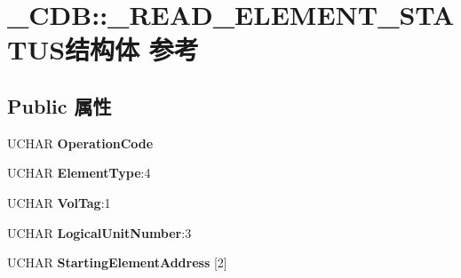 \hypertarget{struct___c_d_b_1_1___r_e_a_d___e_l_e_m_e_n_t___s_t_a_t_u_s}{}\section{\+\_\+\+C\+DB\+:\+:\+\_\+\+R\+E\+A\+D\+\_\+\+E\+L\+E\+M\+E\+N\+T\+\_\+\+S\+T\+A\+T\+U\+S结构体 参考}
\label{struct___c_d_b_1_1___r_e_a_d___e_l_e_m_e_n_t___s_t_a_t_u_s}
\subsection*{Public 属性}
\begin{DoxyCompactItemize}
\item 
\mbox{\label{struct___c_d_b_1_1___r_e_a_d___e_l_e_m_e_n_t___s_t_a_t_u_s_ab6b5d045fd3cf3c6a0a0f6bad212c56f}} 
U\+C\+H\+AR {\bfseries Operation\+Code}
\item 
\mbox{\label{struct___c_d_b_1_1___r_e_a_d___e_l_e_m_e_n_t___s_t_a_t_u_s_a6716160ffe8802f4a0d4339c9e27767b}} 
U\+C\+H\+AR {\bfseries Element\+Type}\+:4
\item 
\mbox{\label{struct___c_d_b_1_1___r_e_a_d___e_l_e_m_e_n_t___s_t_a_t_u_s_a191da983202ccf0fd848bb89c2ff08a4}} 
U\+C\+H\+AR {\bfseries Vol\+Tag}\+:1
\item 
\mbox{\label{struct___c_d_b_1_1___r_e_a_d___e_l_e_m_e_n_t___s_t_a_t_u_s_acc7b68bd5c75cbc47cb6ca22a24d1c0f}} 
U\+C\+H\+AR {\bfseries Logical\+Unit\+Number}\+:3
\item 
\mbox{\label{struct___c_d_b_1_1___r_e_a_d___e_l_e_m_e_n_t___s_t_a_t_u_s_aded91825bc3afbb425d9c313e7342a48}} 
U\+C\+H\+AR {\bfseries Starting\+Element\+Address} \mbox{[}2\mbox{]}
\item 
\mbox{\label{struct___c_d_b_1_1___r_e_a_d___e_l_e_m_e_n_t___s_t_a_t_u_s_a6cf60af1b206ea3ff5b1436ee7f3f750}} 

\end{DoxyCompactItemize}
